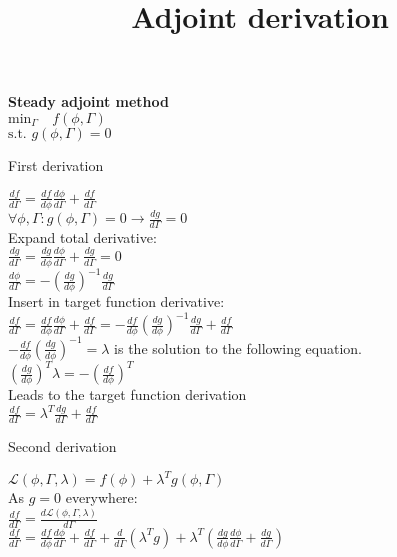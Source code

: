 \documentclass[10pt]{article} %
\title{Adjoint derivation}
\date{}
\begin{document}
\maketitle
\begin{center}
	\textbf{Steady adjoint method}\\
	$\text{min}_\Gamma \quad f(\phi,\Gamma)$\\
	$\text{s.t. } g(\phi,\Gamma) = 0$
\end{center}
\begin{Parallel}[v]{0.50\textwidth}{0.5\textwidth}
	\ParallelLText
	{	
		First derivation\\
		\begin{center}
			$\frac{d f}{d \Gamma} = \frac{d f}{d \phi} \frac{d \phi}{d \Gamma} + \frac{df}{d\Gamma}$\\
			$\forall \phi,\Gamma :g(\phi,\Gamma)=0 \rightarrow \frac{d g}{d \Gamma} = 0$\\
			Expand total derivative:\\
			$\frac{d g}{d \Gamma} = \frac{d g}{d \phi}\frac{d \phi}{d \Gamma} + \frac{d g}{d \Gamma} = 0$\\
			$\frac{d\phi}{d\Gamma} = -\left(\frac{dg}{d\phi}\right)^{-1} \frac{dg}{d\Gamma}$\\
			Insert in target function derivative:\\
			$\frac{d f}{d \Gamma} = \frac{d f}{d \phi} \frac{d \phi}{d \Gamma} + \frac{df}{d\Gamma} = - \frac{d f}{d \phi} \left(\frac{dg}{d\phi}\right)^{-1} \frac{dg}{d\Gamma} + \frac{df}{d\Gamma}$\\
			$- \frac{d f}{d \phi} \left(\frac{dg}{d\phi}\right)^{-1} = \lambda$ is the solution to the following equation.\\
			$ \left(\frac{dg}{d\phi}\right)^T \lambda =  -\left(\frac{df}{d\phi}\right)^T $\\
			Leads to the target function derivation\\
			$\frac{d f}{d \Gamma} = \lambda^T \frac{dg}{d\Gamma} + \frac{df}{d\Gamma}$\\
		\end{center}
	}
	\ParallelRText
	{	
		Second derivation\\
		\begin{center}
			$\mathcal{L}(\phi,\Gamma,\lambda) = f(\phi) + \lambda ^ T g(\phi,\Gamma)$\\
			As $g=0$ everywhere:\\
			$\frac{df}{d\Gamma} = \frac{d\mathcal{L}(\phi,\Gamma,\lambda)}{d\Gamma}$\\
			$\frac{df}{d\Gamma} = \frac{df}{d\phi} \frac{d\phi}{d\Gamma} + \frac{df}{d\Gamma} + \frac{d}{d\Gamma} \left(\lambda ^ T g\right) + \lambda ^ T \left(\frac{dg}{d\phi} \frac{d\phi}{d\Gamma} + \frac{dg}{d\Gamma}\right)$\\

\end{center}}
\end{Parallel}
\end{document}
